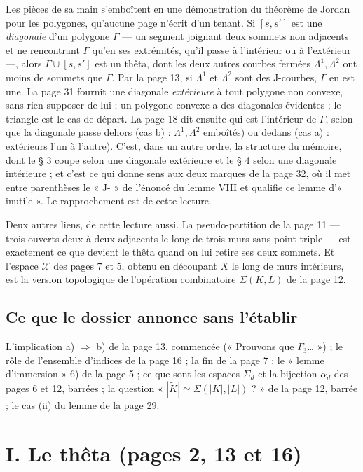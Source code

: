 \documentclass[11pt,a4paper]{article}
\begin{document}
Les pièces de sa main s'emboîtent en une démonstration du théorème de Jordan
pour les polygones, qu'aucune page n'écrit d'un tenant. Si $[s, s']$ est une
\emph{diagonale} d'un polygone $\Gamma$ — un segment joignant deux sommets
non adjacents et ne rencontrant $\Gamma$ qu'en ses extrémités, qu'il passe à
l'intérieur ou à l'extérieur —, alors $\Gamma \cup [s, s']$ est un thêta, dont
les deux autres courbes fermées $\Lambda^1, \Lambda^2$ ont moins de sommets que
$\Gamma$. Par la page 13, si $\Lambda^1$ et $\Lambda^2$ sont des J-courbes,
$\Gamma$ en est une. La page 31 fournit une diagonale \emph{extérieure} à tout
polygone non convexe, sans rien supposer de lui ; un polygone convexe a des
diagonales évidentes ; le triangle est le cas de départ. La page 18 dit ensuite
qui est l'intérieur de $\Gamma$, selon que la diagonale passe dehors (cas b) :
$\Lambda^1, \Lambda^2$ emboîtés) ou dedans (cas a) : extérieurs l'un à
l'autre). C'est, dans un autre ordre, la structure du mémoire, dont le § 3
coupe selon une diagonale extérieure et le § 4 selon une diagonale intérieure ;
et c'est ce qui donne sens aux deux marques de la page 32, où il met entre
parenthèses le « J- » de l'énoncé du lemme VIII et qualifie ce lemme
d'« inutile ». Le rapprochement est de cette lecture.

Deux autres liens, de cette lecture aussi. La pseudo-partition de la page 11
— trois ouverts deux à deux adjacents le long de trois murs sans point triple —
est exactement ce que devient le thêta quand on lui retire ses deux sommets.
Et l'espace $\mathcal{X}$ des pages 7 et 5, obtenu en découpant $X$ le long de
murs intérieurs, est la version topologique de l'opération combinatoire
$\Sigma(K, L)$ de la page 12.

\subsection*{Ce que le dossier annonce sans l'établir}

L'implication a) $\Rightarrow$ b) de la page 13, commencée (« Prouvons que
$\Gamma_3$… ») ; le rôle de l'ensemble d'indices de la page 16 ; la fin de la
page 7 ; le « lemme d'immersion » 6) de la page 5 ; ce que sont les espaces
$\Sigma_d$ et la bijection $\alpha_d$ des pages 6 et 12, barrées ; la question
« $|\tilde{K}| \simeq \Sigma(|K|, |L|)$ ? » de la page 12, barrée ; le cas (ii)
du lemme de la page 29.

\section*{I. Le thêta (pages 2, 13 et 16)}
\end{document}
